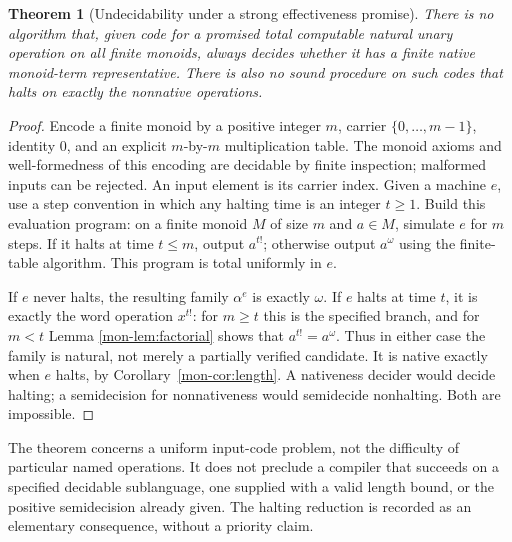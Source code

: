 \documentclass[11pt]{article}
\newtheorem{theorem}{Theorem}[section]
\theoremstyle{definition}
\theoremstyle{remark}
\begin{document}
\begin{theorem}[Undecidability under a strong effectiveness promise]
\label{mon-thm:undecidable}
There is no algorithm that, given code for a promised total computable
natural unary operation on all finite monoids, always decides whether it
has a finite native monoid-term representative. There is also no sound
procedure on such codes that halts on exactly the nonnative operations.
\end{theorem}
\begin{proof}
Encode a finite monoid by a positive integer $m$, carrier
$\{0,\ldots,m-1\}$, identity $0$, and an explicit $m$-by-$m$
multiplication table. The monoid axioms and well-formedness of this
encoding are decidable by finite inspection; malformed inputs can be
rejected. An input element is its carrier index. Given a machine $e$, use
a step convention in which any halting time is an integer $t\geq1$.
Build this evaluation program: on a finite monoid
$M$ of size $m$ and $a\in M$, simulate $e$ for $m$ steps. If it halts
at time $t\leq m$, output $a^{t!}$; otherwise output $a^\omega$ using
the finite-table algorithm. This program is total uniformly in $e$.

If $e$ never halts, the resulting family $\alpha^e$ is exactly $\omega$.
If $e$ halts at time $t$, it is exactly the word operation $x^{t!}$:
for $m\geq t$ this is the specified branch, and for $m<t$ Lemma
\ref{mon-lem:factorial} shows that $a^{t!}=a^\omega$. Thus in either case
the family is natural, not merely a partially verified candidate. It is
native exactly when $e$ halts, by Corollary~\ref{mon-cor:length}.
A nativeness decider would decide halting; a semidecision for nonnativeness
would semidecide nonhalting. Both are impossible.
\end{proof}
The theorem concerns a uniform input-code problem, not the difficulty of
particular named operations. It does not preclude a compiler that succeeds
on a specified decidable sublanguage, one supplied with a valid length
bound, or the positive semidecision already given. The halting reduction
is recorded as an elementary consequence, without a priority claim.
\end{document}
